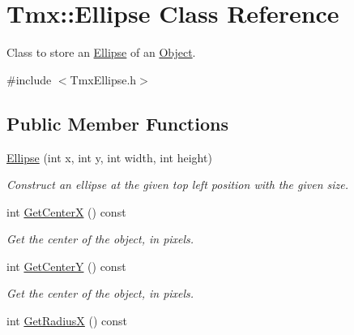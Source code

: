 \hypertarget{classTmx_1_1Ellipse}{\section{Tmx\-:\-:Ellipse Class Reference}
\label{classTmx_1_1Ellipse}
}


Class to store an \hyperlink{classTmx_1_1Ellipse}{Ellipse} of an \hyperlink{classTmx_1_1Object}{Object}.  




{\ttfamily \#include $<$Tmx\-Ellipse.\-h$>$}

\subsection*{Public Member Functions}
\begin{DoxyCompactItemize}
\item 
\hypertarget{classTmx_1_1Ellipse_a83ab98716ec7cee2925b379c019c4562}{\hyperlink{classTmx_1_1Ellipse_a83ab98716ec7cee2925b379c019c4562}{Ellipse} (int x, int y, int width, int height)}\label{classTmx_1_1Ellipse_a83ab98716ec7cee2925b379c019c4562}

\begin{DoxyCompactList}\small\item\em Construct an ellipse at the given top left position with the given size. \end{DoxyCompactList}\item 
\hypertarget{classTmx_1_1Ellipse_a8e1ef78d1dfba155c27f9964760d4b59}{int \hyperlink{classTmx_1_1Ellipse_a8e1ef78d1dfba155c27f9964760d4b59}{Get\-Center\-X} () const }\label{classTmx_1_1Ellipse_a8e1ef78d1dfba155c27f9964760d4b59}

\begin{DoxyCompactList}\small\item\em Get the center of the object, in pixels. \end{DoxyCompactList}\item 
\hypertarget{classTmx_1_1Ellipse_aaae950d8553312067c6187263c320225}{int \hyperlink{classTmx_1_1Ellipse_aaae950d8553312067c6187263c320225}{Get\-Center\-Y} () const }\label{classTmx_1_1Ellipse_aaae950d8553312067c6187263c320225}

\begin{DoxyCompactList}\small\item\em Get the center of the object, in pixels. \end{DoxyCompactList}\item 
\hypertarget{classTmx_1_1Ellipse_a0bfb57d6097e0c7776303e03abaaebbf}{int \hyperlink{classTmx_1_1Ellipse_a0bfb57d6097e0c7776303e03abaaebbf}{Get\-Radius\-X} () const }\label{classTmx_1_1Ellipse_a0bfb57d6097e0c7776303e03abaaebbf}


\end{DoxyCompactItemize}
